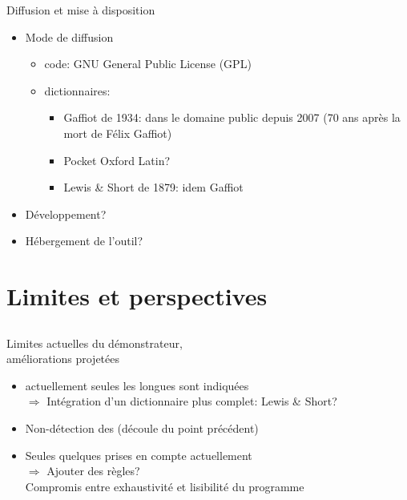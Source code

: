 \documentclass{beamer}
\begin{document}
\begin{frame}{Diffusion et mise à disposition}

\begin{itemize}
\item Mode de diffusion

\begin{itemize}
\item code: GNU General Public License (GPL)
\item dictionnaires:

\begin{itemize}
\item Gaffiot de 1934: dans le domaine public depuis 2007 (70 ans après la mort de Félix Gaffiot)
\item Pocket Oxford Latin?
\item Lewis \& Short de 1879: idem Gaffiot
\end{itemize}


\end{itemize}

\item Développement?

\item Hébergement de l'outil?

\end{itemize}
\end{frame} %



\section{Limites et perspectives}

\subsection*{}


\begin{frame}{Limites actuelles du démonstrateur, \\ améliorations projetées}

\begin{itemize}
\item {} actuellement seules les longues sont indiquées\\
$\Rightarrow$ Intégration d'un dictionnaire plus complet: Lewis \& Short?

\vfill

\item Non-détection des  {\small (découle du point précédent)}

\vfill

\item Seules quelques  prises en compte actuellement\\
$\Rightarrow$ Ajouter des règles?\\
\hfill Compromis entre exhaustivité et lisibilité du programme

\end{itemize}
\end{frame} %
\end{document}
